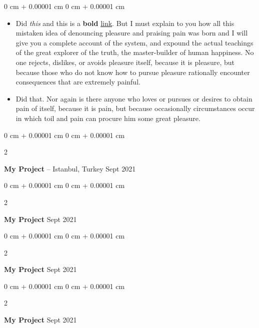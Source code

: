 \documentclass[10pt, letterpaper]{article}
\newenvironment{highlights}{
    \begin{itemize}[
        topsep=0.10 cm,
        parsep=0.10 cm,
        partopsep=0pt,
        itemsep=0pt,
        leftmargin=0 cm + 10pt
    ]
}{
    \end{itemize}
} %
\newenvironment{onecolentry}{
    \begin{adjustwidth}{
        0 cm + 0.00001 cm
    }{
        0 cm + 0.00001 cm
    }
}{
    \end{adjustwidth}
} %
\newenvironment{twocolentry}[2][]{
    \onecolentry
    \def\secondColumn{#2}
    \setcolumnwidth{\fill, 4.5 cm}
    \begin{paracol}{2}
}{
    \switchcolumn \raggedleft \secondColumn
    \end{paracol}
    \endonecolentry
} %
\begin{document}
        \vspace{0.10 cm}
        \begin{onecolentry}
            \begin{highlights}
                \item Did \textit{this} and this is a \textbf{bold} \href{https://example.com}{link}. But I must explain to you how all this mistaken idea of denouncing pleasure and praising pain was born and I will give you a complete account of the system, and expound the actual teachings of the great explorer of the truth, the master-builder of human happiness. No one rejects, dislikes, or avoids pleasure itself, because it is pleasure, but because those who do not know how to pursue pleasure rationally encounter consequences that are extremely painful.
                \item Did that. Nor again is there anyone who loves or pursues or desires to obtain pain of itself, because it is pain, but because occasionally circumstances occur in which toil and pain can procure him some great pleasure.
            \end{highlights}
        \end{onecolentry}


        \vspace{0.2 cm}

        \begin{twocolentry}{
            Sept 2021
        }
            \textbf{My Project} -- Istanbul, Turkey\end{twocolentry}



        \vspace{0.2 cm}

        \begin{twocolentry}{
            Sept 2021
        }
            \textbf{My Project}\end{twocolentry}



        \vspace{0.2 cm}

        \begin{twocolentry}{
            Sept 2021
        }
            \textbf{My Project}\end{twocolentry}



        \vspace{0.2 cm}

        \begin{twocolentry}{
            Sept 2021
        }
            \textbf{My Project}\end{twocolentry}
\end{document}
